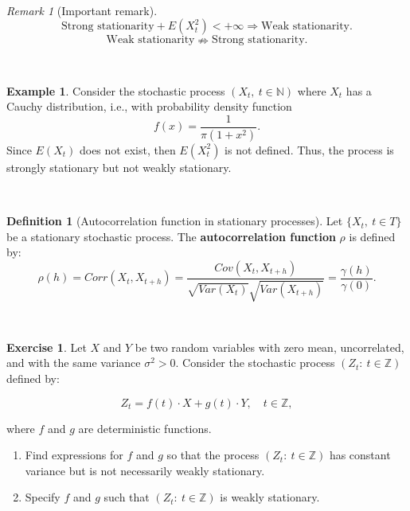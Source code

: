 \documentclass[
  11pt,
  a4paper,
]{book}
\theoremstyle{definition}
\newtheorem{definition}{Definition}[chapter]
\theoremstyle{definition}
\newtheorem{example}{Example}[chapter]
\theoremstyle{definition}
\newtheorem{exercise}{Exercise}[chapter]
\theoremstyle{definition}
\theoremstyle{remark}
\newtheorem*{remark}{Remark}
\begin{document}
\(\,\)

\begin{remark}[Important remark]
\[\text{Strong stationarity} + E(X_t^2) < +\infty \Rightarrow \text{Weak stationarity}.\]
\[\text{Weak stationarity} \nRightarrow \text{Strong stationarity}.\]
\end{remark}

\(\,\)

\begin{example}
Consider the stochastic process \((X_t, ~ t \in \mathbb{N})\) where \(X_t\) has a Cauchy distribution, i.e., with probability density function
\[
f(x) = \frac{1}{\pi(1 + x^2)}.
\]
Since \(E(X_t)\) does not exist, then \(E(X_t^2)\) is not defined. Thus, the process is strongly stationary but not weakly stationary.
\end{example}

\(\,\)

\begin{definition}[Autocorrelation function in stationary processes]
Let \(\{X_t, ~ t \in T\}\) be a stationary stochastic process. The \textbf{autocorrelation function} \(\rho\) is defined by:
\[
\rho(h) = Corr(X_t, X_{t+h}) = \frac{Cov(X_t, X_{t+h})}{\sqrt{Var(X_t)} \sqrt{Var(X_{t+h})}} = \frac{\gamma(h)}{\gamma(0)}.
\]
\end{definition}

\(\,\)

\begin{exercise}

Let \(X\) and \(Y\) be two random variables with zero mean, uncorrelated, and with the same variance \(\sigma^2 > 0\). Consider the stochastic process \((Z_t: ~ t \in \mathbb{Z})\) defined by:

\[
Z_t = f(t) \cdot X + g(t) \cdot Y, \quad t \in \mathbb{Z},
\]

where \(f\) and \(g\) are deterministic functions.

\begin{enumerate}
\def\labelenumi{(\alph{enumi})}
\item
  Find expressions for \(f\) and \(g\) so that the process \((Z_t: ~ t \in \mathbb{Z})\) has constant variance but is not necessarily weakly stationary.
\item
  Specify \(f\) and \(g\) such that \((Z_t: ~ t \in \mathbb{Z})\) is weakly stationary.
\end{enumerate}

\end{exercise}

\(\,\)
\end{document}
